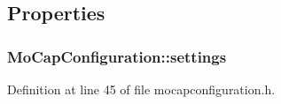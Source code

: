 \subsection{\-Properties}
\hypertarget{group___mo_cap_plugin_ga7211120cc5d6c7feffb594a36552a9af}{
\subsubsection[{settings}]{ {\bf \-Mo\-Cap\-Configuration\-::settings}}}\label{group___mo_cap_plugin_ga7211120cc5d6c7feffb594a36552a9af}


\-Definition at line 45 of file mocapconfiguration.\-h.

